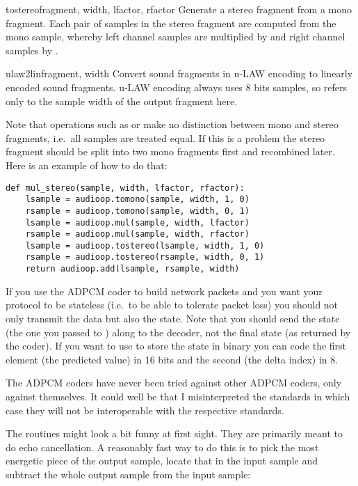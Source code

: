 \begin{funcdesc}{tostereo}{fragment, width, lfactor, rfactor}
Generate a stereo fragment from a mono fragment.  Each pair of samples
in the stereo fragment are computed from the mono sample, whereby left
channel samples are multiplied by  and right channel
samples by .
\end{funcdesc}

\begin{funcdesc}{ulaw2lin}{fragment, width}
Convert sound fragments in u-LAW encoding to linearly encoded sound
fragments.  u-LAW encoding always uses 8 bits samples, so 
refers only to the sample width of the output fragment here.
\end{funcdesc}

Note that operations such as  or  make
no distinction between mono and stereo fragments, i.e.\ all samples
are treated equal.  If this is a problem the stereo fragment should be
split into two mono fragments first and recombined later.  Here is an
example of how to do that:

\begin{verbatim}
def mul_stereo(sample, width, lfactor, rfactor):
    lsample = audioop.tomono(sample, width, 1, 0)
    rsample = audioop.tomono(sample, width, 0, 1)
    lsample = audioop.mul(sample, width, lfactor)
    rsample = audioop.mul(sample, width, rfactor)
    lsample = audioop.tostereo(lsample, width, 1, 0)
    rsample = audioop.tostereo(rsample, width, 0, 1)
    return audioop.add(lsample, rsample, width)
\end{verbatim}

If you use the ADPCM coder to build network packets and you want your
protocol to be stateless (i.e.\ to be able to tolerate packet loss)
you should not only transmit the data but also the state.  Note that
you should send the  state (the one you passed to
) along to the decoder, not the final state (as
returned by the coder).  If you want to use 
to store the state in binary you can code the first element (the
predicted value) in 16 bits and the second (the delta index) in 8.

The ADPCM coders have never been tried against other ADPCM coders,
only against themselves.  It could well be that I misinterpreted the
standards in which case they will not be interoperable with the
respective standards.

The  routines might look a bit funny at first sight.
They are primarily meant to do echo cancellation.  A reasonably
fast way to do this is to pick the most energetic piece of the output
sample, locate that in the input sample and subtract the whole output
sample from the input sample:

